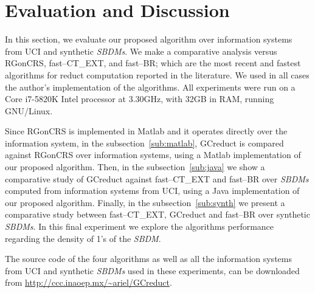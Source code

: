 \documentclass[number,preprint,review,12pt]{elsarticle}
\begin{document}
	
%
\section{Evaluation and Discussion}\label{evaluation}
	In this section, we evaluate our proposed algorithm over information systems from UCI \citep{Bache13} and synthetic \textit{SBDMs}. We make a comparative analysis versus RGonCRS, fast--CT\_EXT, and fast--BR; which are the most recent and fastest algorithms for reduct computation reported in the literature. We used in all cases the author's implementation of the algorithms. All experiments were run on a Core i7-5820K Intel processor at 3.30GHz, with 32GB in RAM, running GNU/Linux.
	
	Since RGonCRS is implemented in Matlab and it operates directly	over the information system, in the subsection~\ref{sub:matlab}, GCreduct is compared against RGonCRS over information systems, using a Matlab implementation of our proposed algorithm. Then, in the subsection~\ref{sub:java} we show a comparative study of GCreduct against fast--CT\_EXT and fast--BR over \textit{SBDMs} computed from information systems from UCI, using a Java implementation of our proposed algorithm. Finally, in the subsection~\ref{sub:synth} we present a comparative study between fast--CT\_EXT, GCreduct and fast--BR over synthetic \textit{SBDMs}. In this final experiment we explore the algorithms performance regarding the density of 1's of the \textit{SBDM}.
	
	The source code of the four algorithms as well as all the information systems from UCI and synthetic \textit{SBDMs} used in these experiments, can be downloaded from \url{http://ccc.inaoep.mx/~ariel/GCreduct}.
	
\end{document}
